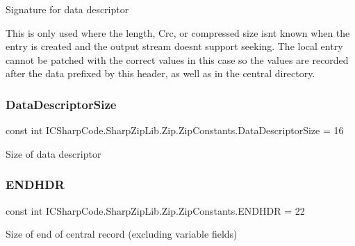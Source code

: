 Signature for data descriptor 

This is only used where the length, Crc, or compressed size isnt known when the entry is created and the output stream doesnt support seeking. The local entry cannot be \textquotesingle{}patched\textquotesingle{} with the correct values in this case so the values are recorded after the data prefixed by this header, as well as in the central directory. \mbox{\label{class_i_c_sharp_code_1_1_sharp_zip_lib_1_1_zip_1_1_zip_constants_aaeaba7ff36a8402b21e66ad75d016541}} 
\subsubsection{\texorpdfstring{Data\+Descriptor\+Size}{DataDescriptorSize}}
{\footnotesize\ttfamily const int I\+C\+Sharp\+Code.\+Sharp\+Zip\+Lib.\+Zip.\+Zip\+Constants.\+Data\+Descriptor\+Size = 16}



Size of data descriptor 

\mbox{\label{class_i_c_sharp_code_1_1_sharp_zip_lib_1_1_zip_1_1_zip_constants_ac83eb90005b7649baa27afe4b75b8852}} 
\subsubsection{\texorpdfstring{E\+N\+D\+H\+DR}{ENDHDR}}
{\footnotesize\ttfamily const int I\+C\+Sharp\+Code.\+Sharp\+Zip\+Lib.\+Zip.\+Zip\+Constants.\+E\+N\+D\+H\+DR = 22}



Size of end of central record (excluding variable fields) 

